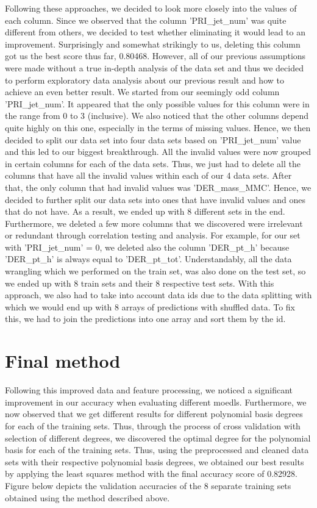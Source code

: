 \documentclass[10pt,conference,compsocconf]{IEEEtran}
\begin{document}
Following these approaches, we decided to look more closely into the values of each column. Since we observed that the column 'PRI\_jet\_num' was quite different from others, we decided to test whether eliminating it would lead to an improvement. Surprisingly and somewhat strikingly to us, deleting this column got us the best score thus far, 0.80468. However, all of our previous assumptions were made without a true in-depth analysis of the data set and thus we decided to perform exploratory data analysis about our previous result and how to achieve an even better result. We started from our seemingly odd column 'PRI\_jet\_num'. It appeared that the only possible values for this column were in the range from 0 to 3 (inclusive). We also noticed that the other columns depend quite highly on this one, especially in the terms of missing values. Hence, we then decided to split our data set into four data sets based on 'PRI\_jet\_num' value and this led to our biggest breakthrough. All the invalid values were now grouped in certain columns for each of the data sets. Thus, we just had to delete all the columns that have all the invalid values within each of our 4 data sets. After that, the only column that had invalid values was 'DER\_mass\_MMC'. Hence, we decided to further split our data sets into ones that have invalid values and ones that do not have. As a result, we ended up with 8 different sets in the end. Furthermore, we deleted a few more columns that we discovered were irrelevant or redundant through correlation testing and analysis. For example, for our set with 'PRI\_jet\_num' = 0, we deleted also the column 'DER\_pt\_h' because 'DER\_pt\_h' is always equal to 'DER\_pt\_tot'. Understandably, all the data wrangling which we performed on the train set, was also done on the test set, so we ended up with 8 train sets and their 8 respective test sets. With this approach, we also had to take into account data ids due to the data splitting with which we would end up with 8 arrays of predictions with shuffled data. To fix this, we had to join the predictions into one array and sort them by the id.

\section{Final method}

Following this improved data and feature processing, we noticed a significant improvement in our accuracy when evaluating different moedls. Furthermore, we now observed that we get different results for different polynomial basis degrees for each of the training sets. Thus, through the process of cross validation with selection of different degrees, we discovered the optimal degree for the polynomial basis for each of the training sets. Thus, using the preprocessed and cleaned data sets with their respective polynomial basis degrees, we obtained our best results by applying the least squares method with the final accuracy score of 0.82928. Figure below depicts the validation accuracies of the 8 separate training sets obtained using the method described above.
\end{document}
